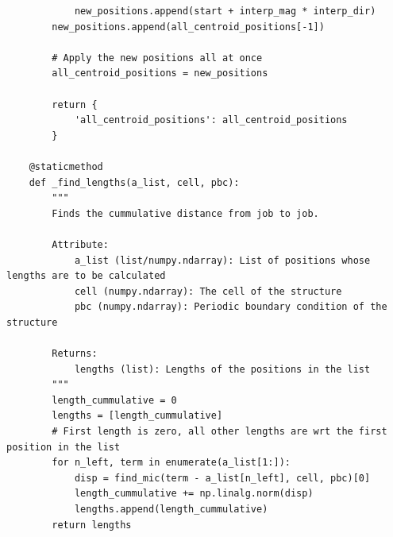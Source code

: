 \documentclass{article}
\begin{document}
\begin{lstlisting}
            new_positions.append(start + interp_mag * interp_dir)
        new_positions.append(all_centroid_positions[-1])

        # Apply the new positions all at once
        all_centroid_positions = new_positions

        return {
            'all_centroid_positions': all_centroid_positions
        }

    @staticmethod
    def _find_lengths(a_list, cell, pbc):
        """
        Finds the cummulative distance from job to job.

        Attribute:
            a_list (list/numpy.ndarray): List of positions whose lengths are to be calculated
            cell (numpy.ndarray): The cell of the structure
            pbc (numpy.ndarray): Periodic boundary condition of the structure

        Returns:
            lengths (list): Lengths of the positions in the list
        """
        length_cummulative = 0
        lengths = [length_cummulative]
        # First length is zero, all other lengths are wrt the first position in the list
        for n_left, term in enumerate(a_list[1:]):
            disp = find_mic(term - a_list[n_left], cell, pbc)[0]
            length_cummulative += np.linalg.norm(disp)
            lengths.append(length_cummulative)
        return lengths
\end{lstlisting}
\end{document}
